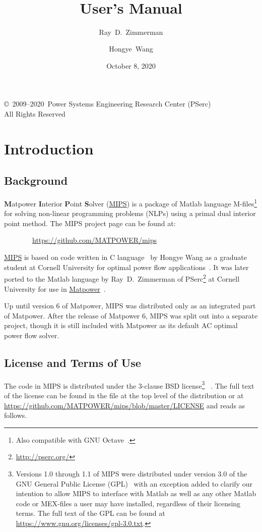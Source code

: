 \documentclass[12pt]{article}
\title{\mipsname{}\\\mips{} \mipsver{}\\
User's Manual}
\author{Ray~D.~Zimmerman \and Hongye~Wang}
\date{October 8, 2020} %
\newcommand{\matlab}[0]{{\sc Matlab}}
\newcommand{\matpower}[0]{{\sc Matpower}}
\newcommand{\matpowerurl}[0]{https://matpower.org}
\newcommand{\matpowerlink}[0]{\href{\matpowerurl}{\matpower{}}}
\newcommand{\mips}[0]{{MIPS}}
\newcommand{\mipsurl}[0]{https://github.com/MATPOWER/mips}
\newcommand{\mipslink}[0]{\href{\mipsurl}{\mips{}}}
\newcommand{\mipsname}[0]{{{\bf M}{\sc atpower} \textbf{I}nterior \textbf{P}oint \textbf{S}olver}}
\newcommand{\pserc}[0]{{\sc PSerc}}
\newcommand{\PSERC}[0]{{Power Systems Engineering Research Center (\pserc{})}}
\newcommand{\code}[1]{{\relsize{-0.5}{\tt{{#1}}}}}  %
\numberwithin{equation}{section}
\numberwithin{table}{section}
\numberwithin{figure}{section}
\begin{document}
\maketitle
\thispagestyle{empty}
\vfill
\begin{center}
{\scriptsize
\copyright~2009--2020~\PSERC{}\\
All Rights Reserved}
\end{center}

\clearpage
\tableofcontents
\clearpage
\listoftables

\clearpage
\section{Introduction}

\subsection{Background}

\mipsname{} (\mipslink{}) is a package of \matlab{} language M-files\footnote{Also compatible with GNU Octave~\cite{octave}.} for solving non-linear programming problems (NLPs) using a primal dual interior point method. The \mips{} project page can be found at:

\bigskip

~~~~~~~~\url{\mipsurl}

\bigskip

\mipslink{} is based on code written in C language~\cite{tspopf} by Hongye Wang as a graduate student at Cornell University for optimal power flow applications~\cite{wang2007a,wang2007}. It was later ported to the \matlab{} language by Ray~D.~Zimmerman of \pserc{}\footnote{\url{http://pserc.org/}} at Cornell University for use in \matpowerlink{}~\cite{zimmerman2011,matpower}.

Up until version 6 of \matpower{}, \mips{} was distributed only as an integrated part of \matpower{}. After the release of \matpower{} 6, \mips{} was split out into a separate project, though it is still included with \matpower{} as its default AC optimal power flow solver.


\clearpage
\subsection{License and Terms of Use}

The code in \mips{} is distributed under the 3-clause BSD license\footnote{Versions 1.0 through 1.1 of \mips{} were distributed under version 3.0 of the GNU General Public License (GPL)~\cite{gpl} with an exception added to clarify our intention to allow \mips{} to interface with \matlab{} as well as any other \matlab{} code or MEX-files a user may have installed, regardless of their licensing terms. The full text of the GPL can be found at \url{https://www.gnu.org/licenses/gpl-3.0.txt}.}
~\cite{bsd}. The full text of the license can be found in the \code{LICENSE} file at the top level of the distribution or at \url{https://github.com/MATPOWER/mips/blob/master/LICENSE} and reads as follows.
\end{document}
